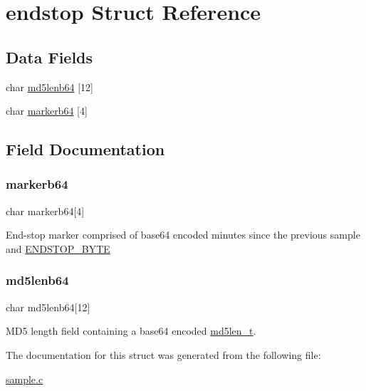 \hypertarget{structendstop}{}\section{endstop Struct Reference}
\label{structendstop}
\subsection*{Data Fields}
\begin{DoxyCompactItemize}
\item 
char \mbox{\hyperlink{structendstop_ae5f29c2e1b08176f604e6a4255147883}{md5lenb64}} \mbox{[}12\mbox{]}
\item 
char \mbox{\hyperlink{structendstop_a45d0b3c1f88901a3d92d905bd044672d}{markerb64}} \mbox{[}4\mbox{]}
\end{DoxyCompactItemize}


\subsection{Field Documentation}
\mbox{\label{structendstop_a45d0b3c1f88901a3d92d905bd044672d}} 
\subsubsection{\texorpdfstring{markerb64}{markerb64}}
{\footnotesize\ttfamily char markerb64\mbox{[}4\mbox{]}}

End-\/stop marker comprised of base64 encoded minutes since the previous sample and \mbox{\hyperlink{sample_8c_a639bc14d5477eb6e1bbbdaec7ea6fd8c}{E\+N\+D\+S\+T\+O\+P\+\_\+\+B\+Y\+TE}} \mbox{\label{structendstop_ae5f29c2e1b08176f604e6a4255147883}} 
\subsubsection{\texorpdfstring{md5lenb64}{md5lenb64}}
{\footnotesize\ttfamily char md5lenb64\mbox{[}12\mbox{]}}

M\+D5 length field containing a base64 encoded \mbox{\hyperlink{smplhist_8h_acc281e4cc90073d250cb40e8e91897c9}{md5len\+\_\+t}}. 

The documentation for this struct was generated from the following file\+:\begin{DoxyCompactItemize}
\item 
\mbox{\hyperlink{sample_8c}{sample.\+c}}\end{DoxyCompactItemize}

